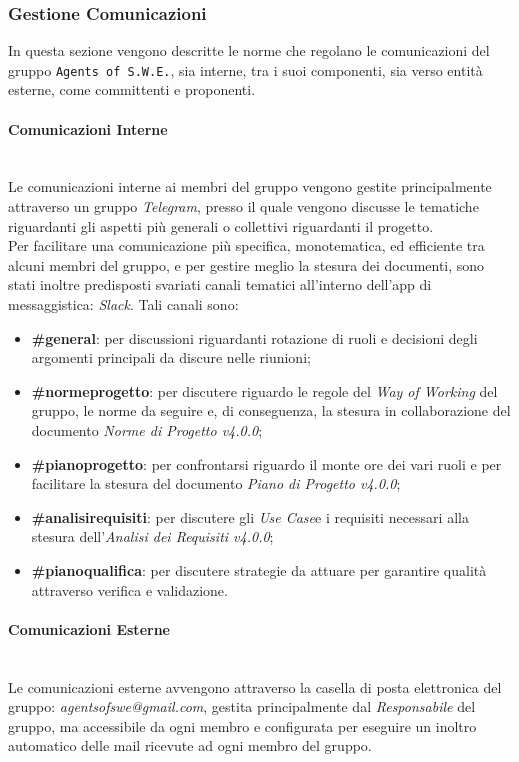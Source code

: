 \subsubsection{Gestione Comunicazioni}
	In questa sezione vengono descritte le norme che regolano le comunicazioni del gruppo \texttt{Agents of S.W.E.}, 		sia interne, tra i suoi componenti, sia verso entità esterne, come committenti e proponenti.

\paragraph{Comunicazioni Interne} ~\\
	Le comunicazioni interne ai membri del gruppo vengono gestite principalmente attraverso un gruppo 										\textit{Telegram}\glossario, presso il quale vengono discusse le tematiche riguardanti gli aspetti più generali o collettivi riguardanti il progetto. \\
	Per facilitare una comunicazione più specifica, monotematica, ed efficiente tra alcuni membri del gruppo, e per 			gestire meglio la stesura dei documenti, sono stati inoltre predisposti svariati canali tematici all'interno 				dell'app di messaggistica: \textit{Slack}\glossario. Tali canali sono:
	\begin{itemize}
	\item \textbf{\#general}: per discussioni riguardanti rotazione di ruoli e decisioni degli argomenti principali 				da discure nelle riunioni;
	\item \textbf{\#normeprogetto}: per discutere riguardo le regole del \textit{Way of Working} del gruppo, le norme 		da seguire e, di conseguenza, la stesura in collaborazione del documento \textit{Norme di Progetto v4.0.0};
	\item \textbf{\#pianoprogetto}: per confrontarsi riguardo il monte ore dei vari ruoli e per facilitare la stesura 		del documento \textit{Piano di Progetto v4.0.0};
	\item \textbf{\#analisirequisiti}: per discutere gli \textit{Use Case}\glossario e i requisiti necessari alla 				stesura dell'\textit{Analisi dei Requisiti v4.0.0};
	\item \textbf{\#pianoqualifica}: per discutere strategie da attuare per garantire qualità attraverso 									verifica e validazione.
	\end{itemize}

\paragraph{Comunicazioni Esterne} ~\\
	Le comunicazioni esterne avvengono attraverso la casella di posta elettronica del gruppo: 														\textit{agentsofswe@gmail.com}, gestita principalmente dal \textit{Responsabile} del gruppo, ma accessibile da 			ogni membro e configurata per eseguire un inoltro automatico delle mail ricevute ad ogni membro del gruppo.


